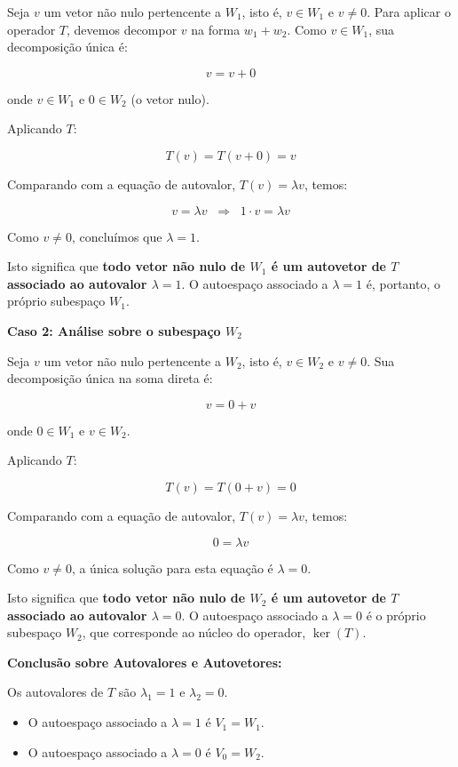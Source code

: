 Seja $v$ um vetor não nulo pertencente a $W_1$, isto é, $v \in W_1$ e $v \neq 0$.
Para aplicar o operador $T$, devemos decompor $v$ na forma $w_1+w_2$. Como $v \in W_1$, sua
decomposição única é:

\[
v = v+0
\]

onde $v \in W_1$ e $0 \in W_2$ (o vetor nulo).

Aplicando $T$:

\[
T(v)=T(v+0)=v
\]

Comparando com a equação de autovalor, $T(v)=\lambda v$, temos:

\[
v=\lambda v \;\;\Longrightarrow\;\; 1 \cdot v = \lambda v
\]

Como $v\neq 0$, concluímos que $\lambda=1$.

Isto significa que \textbf{todo vetor não nulo de $W_1$ é um autovetor de $T$ associado ao autovalor $\lambda=1$}.
O autoespaço associado a $\lambda=1$ é, portanto, o próprio subespaço $W_1$.

\textbf{Caso 2: Análise sobre o subespaço $W_2$}

Seja $v$ um vetor não nulo pertencente a $W_2$, isto é, $v \in W_2$ e $v \neq 0$.
Sua decomposição única na soma direta é:

\[
v = 0+v
\]

onde $0 \in W_1$ e $v \in W_2$.

Aplicando $T$:

\[
T(v) = T(0+v)=0
\]

Comparando com a equação de autovalor, $T(v)=\lambda v$, temos:

\[
0=\lambda v
\]

Como $v\neq 0$, a única solução para esta equação é $\lambda=0$.

Isto significa que \textbf{todo vetor não nulo de $W_2$ é um autovetor de $T$ associado ao autovalor $\lambda=0$}.
O autoespaço associado a $\lambda=0$ é o próprio subespaço $W_2$, que corresponde ao núcleo do
operador, $\ker(T)$.

\textbf{Conclusão sobre Autovalores e Autovetores:}

Os autovalores de $T$ são $\lambda_1=1$ e $\lambda_2=0$.

\begin{itemize}
\item O autoespaço associado a $\lambda=1$ é $V_1=W_1$.
\item O autoespaço associado a $\lambda=0$ é $V_0=W_2$.
\end{itemize}

